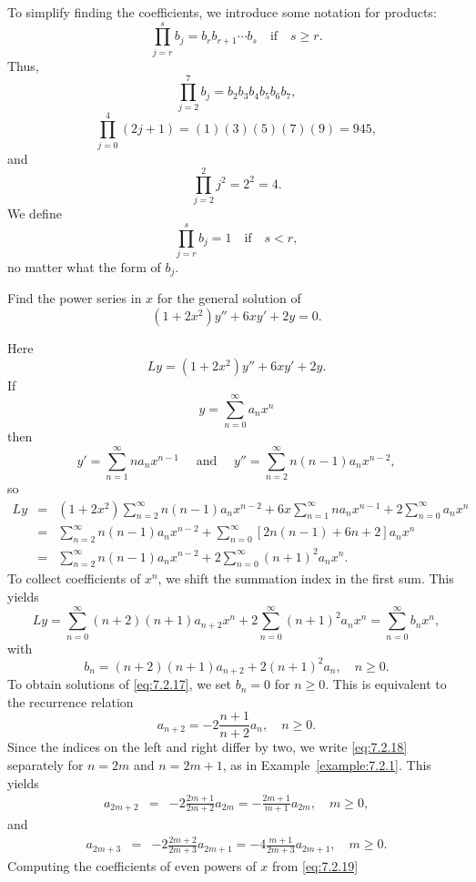 \documentclass{ximera}
\begin{document}
To simplify
finding the coefficients, we introduce some notation for
products:
$$
\prod^s_{j=r}b_j=b_rb_{r+1}\cdots b_s\quad \mbox{if}
\quad s\geq r.
$$
Thus,
$$
\prod^7_{j=2}b_j=b_2b_3b_4b_5b_6b_7,
$$
$$
\prod^4_{j=0}(2j+1)=(1)(3)(5)(7)(9)=945,
$$
and
$$
\prod^2_{j=2}j^2=2^2=4.
$$
We define
$$
\prod^s_{j=r}b_j=1\quad \mbox{if}\quad s < r,
$$
no matter what the form of $b_j$.

\begin{example}\label{example:7.2.2}
Find the power series in $x$ for the general solution of
\begin{equation}\label{eq:7.2.17}
 (1+2x^2)y''+6xy'+2y=0.
\end{equation}
\begin{explanation}
Here
$$
Ly=(1+2x^2)y''+6xy'+2y.
$$
If
$$
y=\sum_{n=0}^\infty a_nx^n
$$
then
$$
y'=\sum_{n=1}^\infty na_nx^{n-1}\quad\mbox{ and }\quad
y''=\sum_{n=2}^\infty n(n-1)a_nx^{n-2},
$$
so
\begin{eqnarray*}
Ly&=&(1+2x^2) \sum^\infty_{n=2}n(n-1)a_nx^{n-2}+ 6x
 \sum^\infty_{n=1}na_nx^{n-1}
 +2 \sum^\infty_{n=0}a_nx^n\\
&=&\sum_{n=2}^\infty n(n-1)a_nx^{n-2}+\sum_{n=0}^\infty
\left[2n(n-1)+6n+2\right]a_nx^n\\
&=&\sum_{n=2}^\infty n(n-1)a_nx^{n-2}+2\sum_{n=0}^\infty(n+1)^2a_nx^n.
\end{eqnarray*}
To collect coefficients of $x^n$,  we shift the summation index
in the first sum.  This yields
$$
Ly=\sum_{n=0}^\infty(n+2)(n+1)a_{n+2}x^n+2\sum_{n=0}^\infty(n+1)^2a_nx^n
=\sum_{n=0}^\infty b_nx^n,
$$
with
$$
b_n=(n+2)(n+1)a_{n+2}+2(n+1)^2a_n,\quad n\geq0.
$$
To obtain solutions of \eqref{eq:7.2.17}, we set $b_n=0$ for $n\geq0$. This
is equivalent to the recurrence relation
 \begin{equation}\label{eq:7.2.18}
a_{n+2}=-2\frac{n+1}{n+2}a_n,\quad n\geq0.
\end{equation}
Since the
indices on the left and right differ by two, we write \eqref{eq:7.2.18}
separately for $n=2m$ and $n=2m+1$, as in Example~\ref{example:7.2.1}.
This yields
\begin{eqnarray}
a_{2m+2}&=&-2 \frac{2m+1}{2m+2}a_{2m}=-\frac{2m+1}{m+1}a_{2m},\quad m
\geq0,\label{eq:7.2.19}
\end{eqnarray}
and
\begin{eqnarray}
a_{2m+3}&=&-2\frac{2m+2}{2m+3}a_{2m+1}=-4\frac{m+1}{2m+3}a_{2m+1},\quad
m\geq0. \label{eq:7.2.20}
\end{eqnarray}
Computing the coefficients of even powers of $x$ from \eqref{eq:7.2.19}

\end{explanation}
\end{example}
\end{document}

